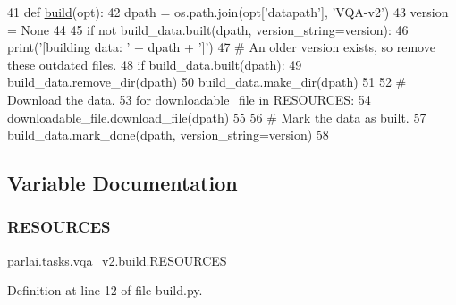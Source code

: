 \begin{DoxyCode}
41 \textcolor{keyword}{def }\hyperlink{namespacedialog__babi__feedback_1_1build_a7a9d289f7493a5ded13c4b7f071b6184}{build}(opt):
42     dpath = os.path.join(opt[\textcolor{stringliteral}{'datapath'}], \textcolor{stringliteral}{'VQA-v2'})
43     version = \textcolor{keywordtype}{None}
44 
45     \textcolor{keywordflow}{if} \textcolor{keywordflow}{not} build\_data.built(dpath, version\_string=version):
46         print(\textcolor{stringliteral}{'[building data: '} + dpath + \textcolor{stringliteral}{']'})
47         \textcolor{comment}{# An older version exists, so remove these outdated files.}
48         \textcolor{keywordflow}{if} build\_data.built(dpath):
49             build\_data.remove\_dir(dpath)
50         build\_data.make\_dir(dpath)
51 
52         \textcolor{comment}{# Download the data.}
53         \textcolor{keywordflow}{for} downloadable\_file \textcolor{keywordflow}{in} RESOURCES:
54             downloadable\_file.download\_file(dpath)
55 
56         \textcolor{comment}{# Mark the data as built.}
57         build\_data.mark\_done(dpath, version\_string=version)
58 \end{DoxyCode}


\subsection{Variable Documentation}
\mbox{\label{namespaceparlai_1_1tasks_1_1vqa__v2_1_1build_a8dccbe691a8c92e52857fad46442cff7}} 
\subsubsection{\texorpdfstring{R\+E\+S\+O\+U\+R\+C\+ES}{RESOURCES}}
{\footnotesize\ttfamily parlai.\+tasks.\+vqa\+\_\+v2.\+build.\+R\+E\+S\+O\+U\+R\+C\+ES}



Definition at line 12 of file build.\+py.

